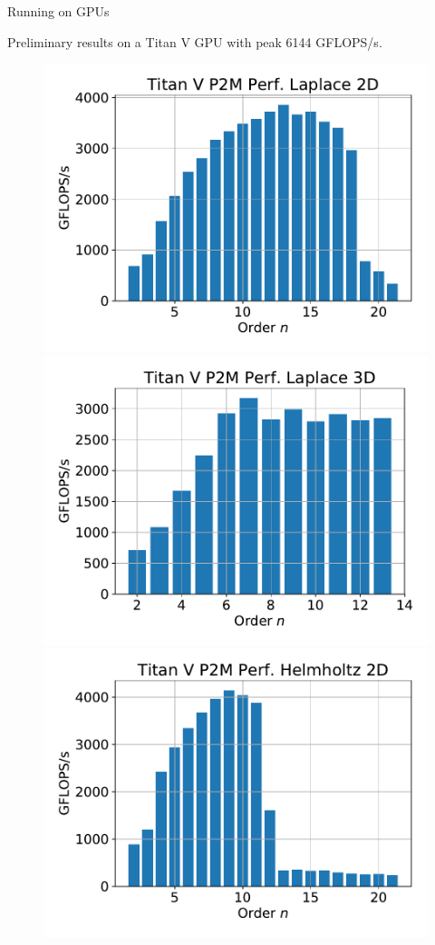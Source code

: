 \documentclass[10pt]{beamer}
\begin{document}
\begin{frame}[fragile]{Running on GPUs}

 Preliminary results on a Titan V GPU with peak 6144 GFLOPS/s.
\begin{figure}
\includegraphics[scale=0.28]{figures/perf-laplace-2d.pdf}
\includegraphics[scale=0.28]{figures/perf-laplace-3d.pdf}
\includegraphics[scale=0.28]{figures/perf-helmholtz-2d.pdf}

\end{figure}
\end{frame}
\end{document}
